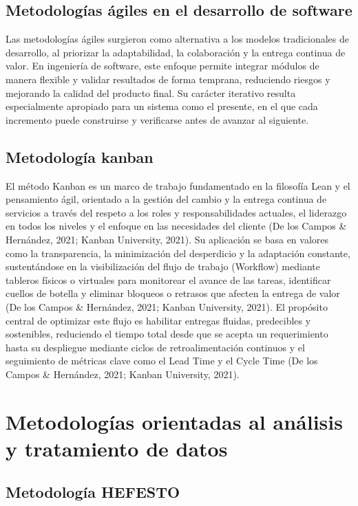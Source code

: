 \documentclass[11pt,oneside,openany]{book}
\begin{document}
\subsection{Metodologías ágiles en el desarrollo de software}

Las metodologías ágiles surgieron como alternativa a los modelos tradicionales de desarrollo, al priorizar la adaptabilidad, la colaboración y la entrega continua de valor. En ingeniería de software, este enfoque permite integrar módulos de manera flexible y validar resultados de forma temprana, reduciendo riesgos y mejorando la calidad del producto final. Su carácter iterativo resulta especialmente apropiado para un sistema como el presente, en el que cada incremento puede construirse y verificarse antes de avanzar al siguiente.

\subsection{Metodología kanban}

El método Kanban es un marco de trabajo fundamentado en la filosofía Lean y el pensamiento ágil, orientado a la gestión del cambio y la entrega continua de servicios a través del respeto a los roles y responsabilidades actuales, el liderazgo en todos los niveles y el enfoque en las necesidades del cliente (De los Campos \& Hernández, 2021; Kanban University, 2021). Su aplicación se basa en valores como la transparencia, la minimización del desperdicio y la adaptación constante, sustentándose en la visibilización del flujo de trabajo (Workflow) mediante tableros físicos o virtuales para monitorear el avance de las tareas, identificar cuellos de botella y eliminar bloqueos o retrasos que afecten la entrega de valor (De los Campos \& Hernández, 2021; Kanban University, 2021). El propósito central de optimizar este flujo es habilitar entregas fluidas, predecibles y sostenibles, reduciendo el tiempo total desde que se acepta un requerimiento hasta su despliegue mediante ciclos de retroalimentación continuos y el seguimiento de métricas clave como el Lead Time y el Cycle Time (De los Campos \& Hernández, 2021; Kanban University, 2021).

\section{Metodologías orientadas al análisis y tratamiento de datos}

\subsection{Metodología HEFESTO}
\end{document}
